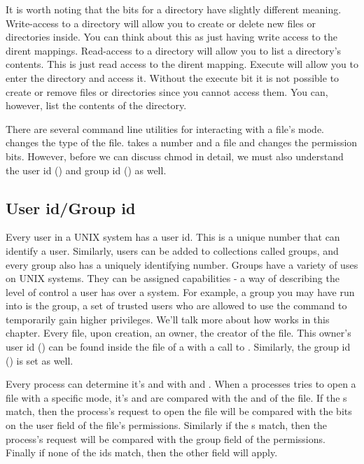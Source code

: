 It is worth noting that the  bits for a directory have slightly different meaning.
Write-access to a directory will allow you to create or delete new files or directories inside.
You can think about this as just having write access to the dirent mappings.
Read-access to a directory will allow you to list a directory's contents.
This is just read access to the dirent mapping.
Execute will allow you to enter the directory and access it.
Without the execute bit it is not possible to create or remove files or directories since you cannot access them.
You can, however, list the contents of the directory.

There are several command line utilities for interacting with a file's mode.
 changes the type of the file.
 takes a number and a file and changes the permission bits.
However, before we can discuss chmod in detail, we must also understand the user id () and group id () as well.

\subsection{User id/Group id}

Every user in a UNIX system has a user id.
This is a unique number that can identify a user.
Similarly, users can be added to collections called groups, and every group also has a uniquely identifying number.
Groups have a variety of uses on UNIX systems.
They can be assigned capabilities - a way of describing the level of control a user has over a system.
For example, a group you may have run into is the  group, a set of trusted users who are allowed to use the command  to temporarily gain higher privileges.
We'll talk more about how  works in this chapter.
Every file, upon creation, an owner, the creator of the file.
This owner's user id () can be found inside the  file of a  with a call to .
Similarly, the group id () is set as well.

Every process can determine it's  and  with  and .
When a processes tries to open a file with a specific mode, it's  and  are compared with the  and  of the file.
If the s match, then the process's request to open the file will be compared with the bits on the user field of the file's permissions.
Similarly if the s match, then the process's request will be compared with the group field of the permissions.
Finally if none of the ids match, then the other field will apply.

